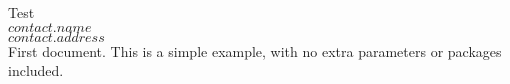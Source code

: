 \documentclass{article}
\begin{document}
Test\\
$contact.name$\\
$contact.address$\\

First document. This is a simple example, with no 
extra parameters or packages included.
\end{document}
